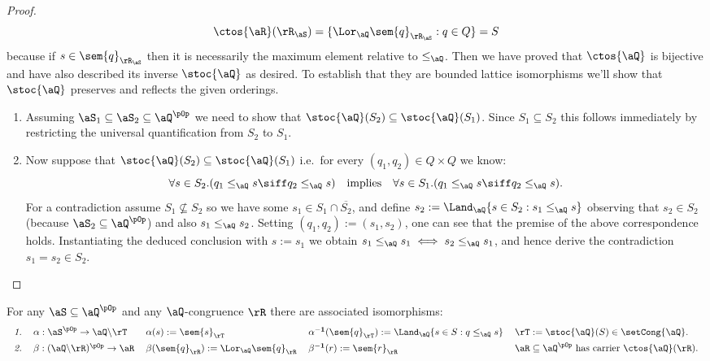 \documentclass{article}
\begin{document}
\begin{proof}
\[
\ctos{\aR}(\rR_\aS)
= \{ \Lor_\aQ \sem{q}_{\rR_\aS} : q \in Q \}
= S
\]
because if $s \in \sem{q}_{\rR_\aS}$ then it is necessarily the maximum element relative to $\leq_\aQ$. Then we have proved that $\ctos{\aQ}$ is bijective and have also described its inverse $\stoc{\aQ}$ as desired. To establish that they are bounded lattice isomorphisms we'll show that $\stoc{\aQ}$ preserves and reflects the given orderings.
\begin{enumerate}
\item
Assuming $\aS_1 \subseteq \aS_2 \subseteq \aQ^{\pOp}$ we need to show that $\stoc{\aQ}(S_2) \subseteq \stoc{\aQ}(S_1)$. Since $S_1 \subseteq S_2$ this follows immediately by restricting the universal quantification from $S_2$ to $S_1$.

\item
Now suppose that $\stoc{\aQ}(S_2) \subseteq \stoc{\aQ}(S_1)$ i.e.\ for every $(q_1,q_2) \in Q \times Q$ we know:
\[
\forall s \in S_2.(q_1 \leq_\aQ s \siff q_2 \leq_\aQ s)
\quad\text{implies}\quad
\forall s \in S_1.(q_1 \leq_\aQ s \siff q_2 \leq_\aQ s).
\]
For a contradiction assume $S_1 \nsubseteq S_2$ so we have some $s_1 \in S_1 \cap \overline{S_2}$, and define $s_2 := \Land_\aQ \{ s \in S_2 : s_1 \leq_\aQ s \}$ observing that $s_2 \in S_2$ (because $\aS_2 \subseteq \aQ^{\pOp}$) and also $s_1 \leq_\aQ s_2$. Setting $(q_1,q_2) := (s_1,s_2)$, one can see that the premise of the above correspondence holds. Instantiating the deduced conclusion with $s := s_1$ we obtain $s_1 \leq_\aQ s_1 \iff s_2 \leq_\aQ s_1$, and hence derive the contradiction $s_1 = s_2 \in S_2$.
\end{enumerate}
\end{proof}


\begin{corollary}
\item
For any $\aS \subseteq \aQ^{\pOp}$ and any $\aQ$-congruence $\rR$ there are associated isomorphisms:
\[
\begin{tabular}{lllll}
\emph{1.} & $\alpha : \aS^{\pOp} \to \aQ\backslash\rT$
&
$\alpha(s) := \sem{s}_\rT$
&
$\alpha^{\bf-1}(\sem{q}_\rT) := \Land_\aQ \{ s \in S : q \leq_\aQ s \}$
&
$\rT := \stoc{\aQ}(S) \in \setCong{\aQ}$.
\\[1ex]
\emph{2.} & $\beta : (\aQ\backslash\rR)^{\pOp} \to \aR$
&
$\beta(\sem{q}_\rR) := \Lor_\aQ \sem{q}_\rR$
&
$\beta^{\bf-1}(r) := \sem{r}_\rR$
&
$\aR \subseteq \aQ^{\pOp}$ has carrier $\ctos{\aQ}(\rR)$.
\end{tabular}
\]
\end{corollary}
\end{document}
